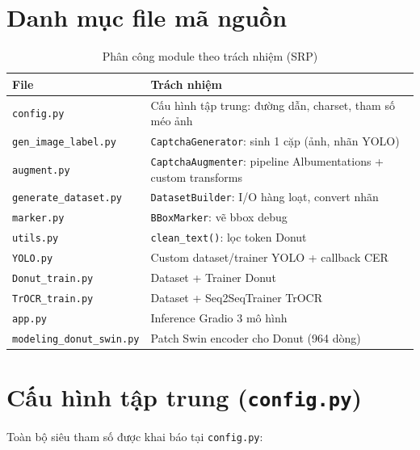 \documentclass[a4paper,12pt]{report}
\begin{document}
\section{Danh mục file mã nguồn}
\begin{table}[H]
  \centering
  \small
  \caption{Phân công module theo trách nhiệm (SRP)}
  \begin{tabular}{p{4.5cm}p{9cm}}
    \toprule
    \textbf{File} & \textbf{Trách nhiệm} \\
    \midrule
    \texttt{config.py} & Cấu hình tập trung: đường dẫn, charset, tham số méo ảnh \\
    \texttt{gen\_image\_label.py} & \texttt{CaptchaGenerator}: sinh 1 cặp (ảnh, nhãn YOLO) \\
    \texttt{augment.py} & \texttt{CaptchaAugmenter}: pipeline Albumentations + custom transforms \\
    \texttt{generate\_dataset.py} & \texttt{DatasetBuilder}: I/O hàng loạt, convert nhãn \\
    \texttt{marker.py} & \texttt{BBoxMarker}: vẽ bbox debug \\
    \texttt{utils.py} & \texttt{clean\_text()}: lọc token Donut \\
    \texttt{YOLO.py} & Custom dataset/trainer YOLO + callback CER \\
    \texttt{Donut\_train.py} & Dataset + Trainer Donut \\
    \texttt{TrOCR\_train.py} & Dataset + Seq2SeqTrainer TrOCR \\
    \texttt{app.py} & Inference Gradio 3 mô hình \\
    \texttt{modeling\_donut\_swin.py} & Patch Swin encoder cho Donut (964 dòng) \\
    \bottomrule
  \end{tabular}
\end{table}

\section{Cấu hình tập trung (\texttt{config.py})}
Toàn bộ siêu tham số được khai báo tại \texttt{config.py}:
\end{document}
